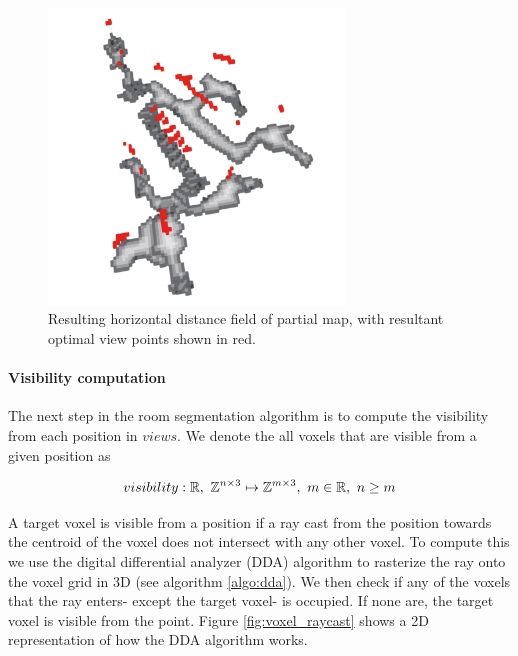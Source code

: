 \begin{figure}[h]
    \centering
    \includegraphics*[width=0.7\textwidth]{./fig/horizontal_distance_field.png}
    \caption{Resulting horizontal distance field of partial map, with resultant optimal view points shown in red.}
    \label{fig:hdf}
\end{figure}

\paragraph{Visibility computation}
The next step in the room segmentation algorithm is to compute the visibility from each position in \(views\). We denote the all voxels that are visible from a given position as 

\begin{equation}
    \label{eq:visibility}
    visibility: \mathbb{R},\ \voxelset \mapsto \mathbb{Z}^{m \times 3},\ m \in \mathbb{R},\ n \geq m
\end{equation}

A target voxel is visible from a position if a ray cast from the position towards the centroid of the voxel does not intersect with any other voxel. To compute this we use the digital differential analyzer (DDA) algorithm to rasterize the ray onto the voxel grid in 3D (see algorithm \ref{algo:dda}). We then check if any of the voxels that the ray enters- except the target voxel- is occupied. If none are, the target voxel is visible from the point. Figure \ref{fig:voxel_raycast} shows a 2D representation of how the DDA algorithm works.

